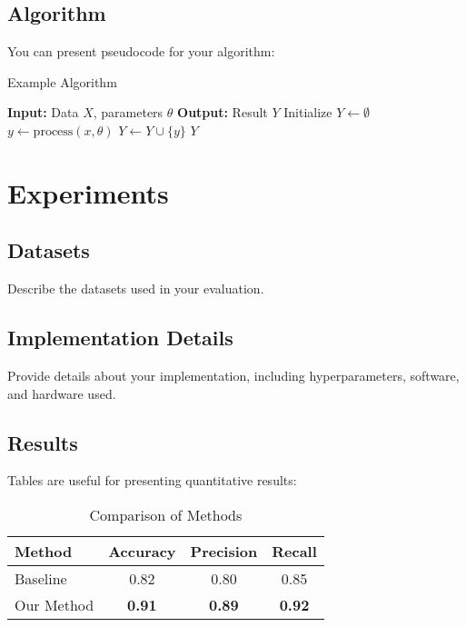 \documentclass[10pt,a4paper,twocolumn]{article}
\begin{document}
\subsection{Algorithm}
\label{subsec:algorithm}

You can present pseudocode for your algorithm:

\begin{algorithm}
\caption{Example Algorithm}
\label{alg:example}
\begin{algorithmic}
\STATE \textbf{Input:} Data $X$, parameters $\theta$
\STATE \textbf{Output:} Result $Y$
\STATE Initialize $Y \gets \emptyset$
    \STATE $y \gets \text{process}(x, \theta)$
    \STATE $Y \gets Y \cup \{y\}$
\ENDFOR
\RETURN $Y$
\end{algorithmic}
\end{algorithm}

\section{Experiments}
\label{sec:experiments}

\subsection{Datasets}
Describe the datasets used in your evaluation.

\subsection{Implementation Details}
Provide details about your implementation, including hyperparameters, software, and hardware used.

\subsection{Results}

Tables are useful for presenting quantitative results:

\begin{table}
\caption{Comparison of Methods}
\label{tab:results}
\centering
\begin{tabular}{lccc}
\toprule
Method & Accuracy & Precision & Recall \\
\midrule
Baseline & 0.82 & 0.80 & 0.85 \\
Our Method & \textbf{0.91} & \textbf{0.89} & \textbf{0.92} \\
\bottomrule
\end{tabular}
\end{table}
\end{document}
